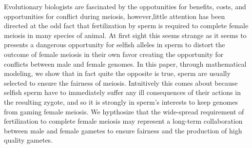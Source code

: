 
Evolutionary biologists are fascinated by the oppotunities for benefits, costs, and opportunities for conflict during meiosis, however,little attention has been directed at the odd fact that fertilization by sperm is required to complete female meiosis in many species of animal. At first sight this seems strange as it seems to presents a dangerous opportunity for selfish alleles in sperm to distort the outcome of female meiosis in their own favor creating the opportunity for conflicts between male and female genomes. In this paper, through mathematical modeling, we show that in fact quite the opposite is true, sperm are usually selected to ensure the fairness of meiosis. Intuitively this comes about because selfish sperm have to immediately suffer any ill consequences of their actions in the resulting zygote, and so it is strongly in sperm's interests to keep genomes from gaming female meiosis. We hypthosize that the wide-spread requirement of fertilization to complete female meiosis may represent a long-term collaboration between male and female gametes to ensure fairness and the production of high quality gametes.
